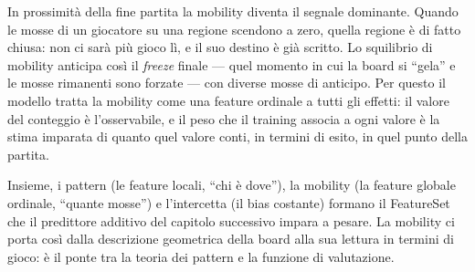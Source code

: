 In prossimità della fine partita la mobility diventa il segnale dominante. Quando le
mosse di un giocatore su una regione scendono a zero, quella regione è di fatto
chiusa: non ci sarà più gioco lì, e il suo destino è già scritto. Lo squilibrio di
mobility anticipa così il \textit{freeze} finale --- quel momento in cui la board si
``gela'' e le mosse rimanenti sono forzate --- con diverse mosse di anticipo. Per
questo il modello tratta la mobility come una feature ordinale a tutti gli effetti: il
valore del conteggio è l'osservabile, e il peso che il training associa a ogni valore
è la stima imparata di quanto quel valore conti, in termini di esito, in quel punto
della partita.

Insieme, i pattern (le feature locali, ``chi è dove''), la mobility (la feature
globale ordinale, ``quante mosse'') e l'intercetta (il bias costante) formano il
FeatureSet che il predittore additivo del capitolo successivo impara a pesare. La
mobility ci porta così dalla descrizione geometrica della board alla sua lettura in
termini di gioco: è il ponte tra la teoria dei pattern e la funzione di valutazione.
